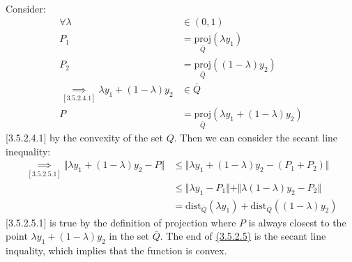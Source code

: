 \documentclass[]{article}
\begin{document}
        \\
        Consider: 
        \begin{align*}\tag{3.5.2.4}\label{eqn:3.5.2.4}
            \forall \lambda &\in (0, 1)
            \\
            P_1 &= \underset{\bar{Q}}{\text{proj}}(\lambda y_1)
            \\
            P_2 &= \underset{\bar{Q}}{\text{proj}}((1 - \lambda) y_2) 
            \\
            \underset{[3.5.2.4.1]}{\implies}
            \lambda y_1 + (1 - \lambda)y_2 & \in \bar{Q}
            \\
            P &= \underset{\bar{Q}}{\text{proj}}(\lambda y_1 + (1 - \lambda) y_2)
        \end{align*}
        [3.5.2.4.1] by the convexity of the set $Q$. Then we can consider the secant line inequality: 
        \begin{align*}\tag{3.5.2.5}\label{eqn:3.5.2.5}
            \underset{[3.5.2.5.1]}{\implies}
            \Vert \lambda y_1 + (1 - \lambda)y_2 - P\Vert & \le 
            \Vert \lambda y_1 + (1 - \lambda)y_2 - (P_1 + P_2)\Vert
            \\
            & \le \Vert \lambda y_1 - P_1\Vert + \Vert \lambda (1 - \lambda)y_2 - P_2\Vert
            \\
            &=\text{dist}_{\bar{Q}} (\lambda y_1) + \text{dist}_{\bar{Q}}((1 - \lambda)y_2)
        \end{align*}
        [3.5.2.5.1] is true by the definition of projection where $P$ is always closest to the point $\lambda y_1 + (1 - \lambda)y_2$ in the set $\bar{Q}$. 
        The end of \hyperref[eqn:3.5.2.5]{(3.5.2.5)} is the secant line inquality, which implies that the function is convex. 
\end{document}
